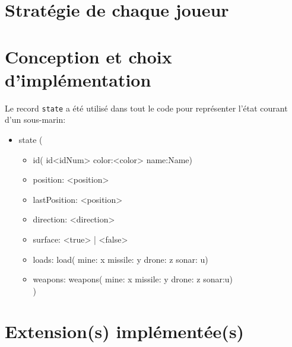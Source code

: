\documentclass[10pt, a4paper]{article}
\begin{document}


{}
\setcounter{page}{1}

\section{Stratégie de chaque joueur}

\section{Conception et  choix d'implémentation}
Le record \texttt{state} a été utilisé dans tout le code pour représenter l'état courant d'un sous-marin:
\begin{itemize}
    \item state ( 
                \begin{itemize}
                    \item id( id<idNum> color:<color> name:Name) 
                    \item position: <position>
                    \item lastPosition: <position>
                    \item direction: <direction> 
                    \item surface: <true> | <false>
                    \item loads: load( mine: x missile: y drone: z sonar: u) 
                    \item weapons: weapons( mine: x missile: y drone: z sonar:u)
                    \\)
                \end{itemize}
\end{itemize}

\section{Extension(s) implémentée(s)}
\end{document}
